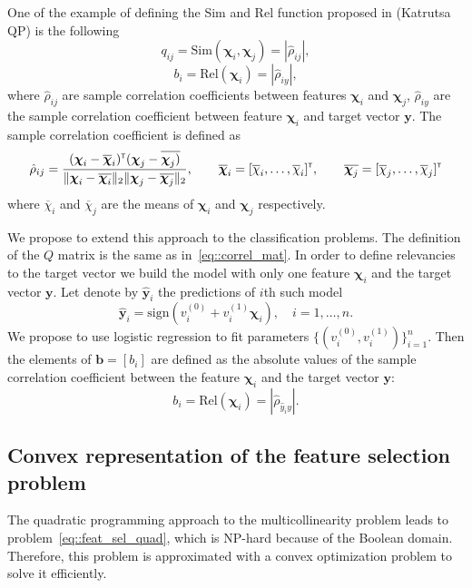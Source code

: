 \documentclass[a4paper,12pt]{article}
\theoremstyle{plain} %
\theoremstyle{definition} %
\theoremstyle{remark} %
\newcommand{\by}{\mathbf{y}}
\newcommand{\bchi}{\boldsymbol{\chi}}
\newcommand{\T}{{\text{\tiny\sffamily\upshape\mdseries T}}}
\begin{document}
	One of the example of defining the Sim and Rel function proposed in (Katrutsa QP) is the following
	\begin{equation}
	q_{ij} = \text{Sim}(\boldsymbol{\chi}_i, \boldsymbol{\chi}_j) = |\hat{\rho}_{ij}|,
	\label{eq::correl_mat}
	\end{equation}
	\begin{equation}
	b_i = \text{Rel}\left(\boldsymbol{\chi}_i\right) = |\hat{\rho}_{iy}|,
	\label{eq::correl_vec_reg}
	\end{equation}
	where $\hat{\rho}_{ij}$ are sample correlation coefficients between features $\bchi_i$ and $\bchi_j$, $\hat{\rho}_{iy}$ are the sample correlation coefficient between feature $\bchi_i$ and target vector $\by$.
	 The sample correlation coefficient is defined as 
	 \begin{equation}
	 \hat{\rho}_{ij} = \dfrac{(\bchi_i - \overline{\bchi}_i)^{\T}(\bchi_j - \overline{\bchi_j)}}{ \|\bchi_i - \overline{\bchi_i}\|_2 \| \bchi_{j} - \overline{\bchi_j}\|_2}, \qquad \overline{\bchi}_i = [\overline{\chi}_i, \ldots, \overline{\chi}_i]^{\T}, \qquad \overline{\bchi_j} = [\overline{\chi}_j, \ldots, \overline{\chi}_j]^{\T}
	 					\label{eq::coef_corell}
	 \end{equation}
	 where $\overline{\chi}_i$ and $\overline{\chi}_j$ are the means of $\bchi_i$ and $\bchi_j$ respectively.
	 
	 We propose to extend this approach to the classification problems. The definition of the $Q$ matrix is the same as in~\eqref{eq::correl_mat}. In order to define relevancies to the target vector we build the model with only one feature $\bchi_i$ and the target vector $\by$. Let denote by $\mathbf{\hat{y}}_i$ the predictions of $i$th such model
	 \[
	 		\mathbf{\hat{y}}_i= \text{sign} \left( v^{(0)}_i + v^{(1)}_i \boldsymbol{\chi}_i \right), \quad i=1, \dots, n.
	 \]
	 We propose to use logistic regression to fit parameters $\{(v^{(0)}_i, v^{(1)}_i )\}_{i=1}^n$. 
	 Then the elements of $\mathbf{b} = [b_i]$ are defined as the absolute values of the sample correlation coefficient between the feature $\boldsymbol{\chi}_i$ and the target vector $\mathbf{y}$:
	 \begin{equation}
	 b_i = \text{Rel}\left(\bchi_i\right) = |\hat{\rho}_{\hat{y}_iy}|.
	 \label{eq::correl_vec}
	 \end{equation}
	 
	 \subsection{Convex representation of the feature selection problem}
	 The quadratic programming approach to the multicollinearity problem leads to problem~\eqref{eq::feat_sel_quad}, which is NP-hard because of the Boolean domain.
	 Therefore, this problem is approximated with a convex optimization problem to solve it efficiently.
	 
\end{document}

